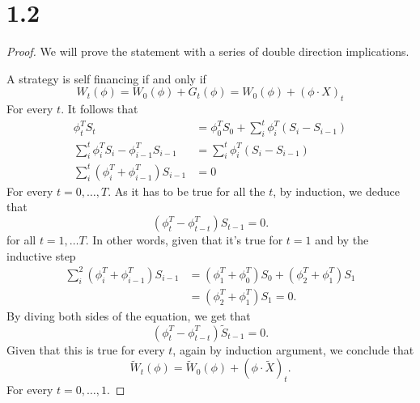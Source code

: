 \documentclass{article}
\begin{document}
\section{1.2}
\begin{proof}
  We will prove the statement with a series of double direction implications.


  A strategy is self financing if and only if
  \[
    W_t(\phi )= W_0(\phi ) + G_t(\phi ) =  W_0(\phi ) + (\phi \cdot  X)_t
  \]
  For every \(t\).
  It follows that
  \begin{align*}
    \phi _t^T S_t                                       & =\phi _0 ^TS_0 + \sum _i^t \phi_{i}^T  (S_i-S_{i-1}) \\
    \sum_{i}^t \phi _i ^T S_{i} - \phi _{i-1}^T S_{i-1} & = \sum _i^t\phi_i^T (S_i-S_{i-1})                    \\
    \sum_{i}^t(\phi _i^T + \phi_{i-1}^T )S_{i-1}        & =0
  \end{align*}
  For every \(t=0,\dots ,T\). As it has to be true for all the \(t\), by induction, we deduce that
  \[
    (\phi _t^T - \phi _{t-t}^T) S_{t-1}= 0.
  \]
  for all \(t=1,\dots T\). In other words, given that it's true for \(t=1\)
  and by the inductive step
  \begin{align*}
    \sum_{i}^2(\phi _i^T + \phi_{i-1}^T )S_{i-1} & =  (\phi _1^T + \phi_{0}^T )S_{0}+  (\phi _2^T + \phi_{1}^T )S_{1} \\
                                                 & = (\phi _2^T + \phi_{1}^T )S_{1} =0.
  \end{align*}
  By diving both sides of the equation, we get that
  \begin{equation}
    (\phi _t^T - \phi _{t-t}^T) \widetilde{S}_{t-1}= 0.
  \end{equation}
  Given that this is true for every \(t\), again by induction argument, we conclude that
  \begin{equation}
    \widetilde{W}_t(\phi ) = \widetilde{W}_0(\phi )+(\phi \cdot \widetilde{X} )_t.
  \end{equation}
  For every \(t=0,\dots ,1\).
\end{proof}
\end{document}
